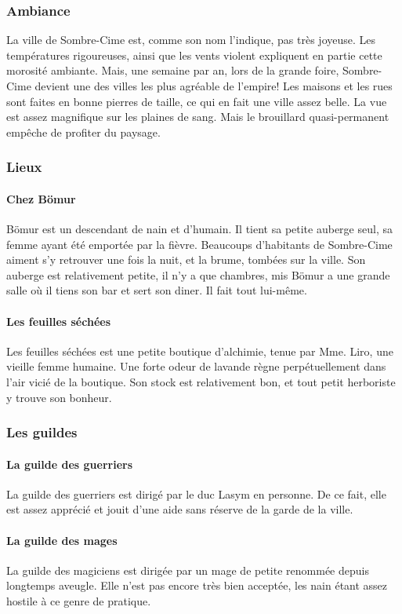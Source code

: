 \subsubsection{Ambiance}
La ville de Sombre-Cime est, comme son nom l'indique, pas très joyeuse. 
Les températures rigoureuses, ainsi que les vents violent expliquent en partie cette morosité ambiante.
Mais, une semaine par an, lors de la grande foire, Sombre-Cime devient une des villes les plus agréable de l'empire!
Les maisons et les rues sont faites en bonne pierres de taille, ce qui en fait une ville assez belle.
La vue est assez magnifique sur les plaines de sang. 
Mais le brouillard quasi-permanent empêche de profiter du paysage.
\subsubsection{Lieux}
\paragraph{Chez Bömur}
Bömur est un descendant de nain et d'humain. 
Il tient sa petite auberge seul, sa femme ayant été emportée par la fièvre.
Beaucoups d'habitants de Sombre-Cime aiment s'y retrouver une fois la nuit, et la brume, tombées sur la ville.
Son auberge est relativement petite, il n'y a que  chambres, mis Bömur a une grande salle où il tiens son bar et sert son diner.
Il fait tout lui-même.
\paragraph{Les feuilles séchées}
Les feuilles séchées est une petite boutique d’alchimie, tenue par Mme. Liro, une vieille femme humaine. Une forte odeur de lavande règne perpétuellement dans l’air vicié de la boutique. Son stock est relativement bon, et tout petit herboriste y trouve son bonheur. 
\subsubsection{Les guildes}
\paragraph{La guilde des guerriers}
La guilde des guerriers est dirigé par le duc Lasym en personne. De ce fait, elle est assez apprécié et jouit d’une aide sans réserve de la garde de la ville.
\paragraph{La guilde des mages}
La guilde des magiciens est dirigée par un mage de petite renommée depuis longtemps aveugle. Elle n’est pas encore très bien acceptée, les nain étant assez hostile à ce genre de pratique. 
